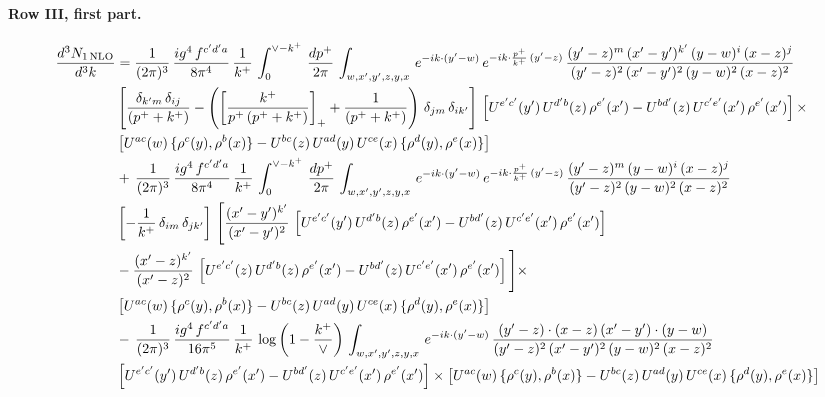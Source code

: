 \documentclass[10pt]{article}
\numberwithin{equation}{section}
\begin{document}
\paragraph{Row III, first part.}
\begin{align}
     \frac{d^{3}N_{1\,\rm NLO}}{d^{3}k} & =  \frac{1}{(2\pi)^{3}}\, \frac{ig^{4}\,f^{c'd'a}}{8\pi^{4}}\, \frac{1}{k^{+}}\,\int_{0}^{\vee-k^{+}}\,  \frac{dp^{+}}{2\pi}\, \int_{w,x',y',z,y,x}\, e^{-ik\cdot (y'-w)}\, e^{-ik\cdot \frac{p^{+}}{k^{+}}\,(y'-z)}\,\frac{(y'-z)^{m}\,(x'-y')^{k'}\,(y-w)^{i}\,(x-z)^{j}}{(y'-z)^{2}\,(x'-y')^{2}\,(y-w)^{2}\,(x-z)^{2}}\notag \\ & \left[\frac{\delta_{k'm}\,\delta_{ij}}{(p^{+}+k^{+})}-\left(\left[\frac{k^{+}}{p^{+}\,(p^{+}+k^{+})}\right]_{+}+\frac{1}{(p^{+}+k^{+})}\right)\,\delta_{jm}\,\delta_{ik'}\right]\, \left[U^{e'c'}(y')\,U^{d'b}(z)\,\rho^{e'}(x')-U^{bd'}(z)\,U^{c'e'}(x')\,\rho^{e'}(x')\right]\times\notag \\ &  \left[U^{ac}(w)\, \{\rho^{c}(y),\rho^{b}(x)\}-U^{bc}(z)\,U^{ad}(y)\,U^{ce}(x)\,\{\rho^{d}(y),\rho^{e}(x)\}\right] \notag \\
&  +\,\frac{1}{(2\pi)^{3}}\, \frac{ig^{4}\,f^{c'd'a}}{8\pi^{4}}\, \frac{1}{k^{+}}\,\int_{0}^{\vee-k^{+}}\,  \frac{dp^{+}}{2\pi}\, \int_{w,x',y',z,y,x}\, e^{-ik\cdot (y'-w)}\, e^{-ik\cdot \frac{p^{+}}{k^{+}}\,(y'-z)}\,\frac{(y'-z)^{m}\,(y-w)^{i}\,(x-z)^{j}}{(y'-z)^{2}\,(y-w)^{2}\,(x-z)^{2}}\notag \\ &   \left[-\frac{1}{k^{+}}\, \delta_{im}\, \delta_{jk'}\right]\, \Bigg[\frac{(x'-y')^{k'}}{(x'-y')^{2}}\,\left[U^{e'c'}(y')\,U^{d'b}(z)\,\rho^{e'}(x')-U^{bd'}(z)\,U^{c'e'}(x')\,\rho^{e'}(x')\right]\notag \\ & -\frac{(x'-z)^{k'}}{(x'-z)^{2}}\,\left[U^{e'c'}(z)\,U^{d'b}(z)\,\rho^{e'}(x')-U^{bd'}(z)\,U^{c'e'}(x')\,\rho^{e'}(x')\right]\Bigg]\times\notag \\ &   \left[U^{ac}(w)\, \{\rho^{c}(y),\rho^{b}(x)\}-U^{bc}(z)\,U^{ad}(y)\,U^{ce}(x)\,\{\rho^{d}(y),\rho^{e}(x)\}\right] \notag \\
& -\,\frac{1}{(2\pi)^{3}}\, \frac{ig^{4}\,f^{c'd'a}}{16\pi^{5}}\, \frac{1}{k^{+}}\,\log{\left(1-\frac{k^{+}}{\vee}\right)}\, \int_{w,x',y',z,y,x}\, e^{-ik\cdot (y'-w)}\,\frac{(y'-z)\cdot (x-z)\,(x'-y')\cdot (y-w)}{(y'-z)^{2}\,(x'-y')^{2}\,(y-w)^{2}\,(x-z)^{2}}\notag \\ &  \left[U^{e'c'}(y')\,U^{d'b}(z)\,\rho^{e'}(x')-U^{bd'}(z)\,U^{c'e'}(x')\,\rho^{e'}(x')\right]\times  \left[U^{ac}(w)\, \{\rho^{c}(y),\rho^{b}(x)\}-U^{bc}(z)\,U^{ad}(y)\,U^{ce}(x)\,\{\rho^{d}(y),\rho^{e}(x)\}\right]
\end{align}
\end{document}
